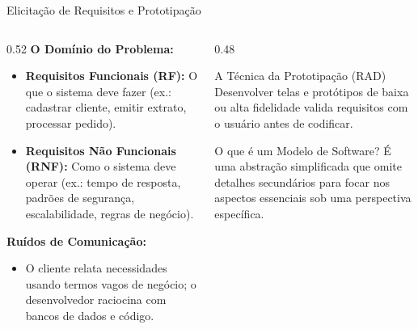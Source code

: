 \documentclass[10pt]{beamer}
\begin{document}
\begin{frame}{Elicitação de Requisitos e Prototipação}
    \begin{columns}
        \begin{column}{0.52\textwidth}
            \textbf{O Domínio do Problema:}
            \begin{itemize}
                \item \textbf{Requisitos Funcionais (RF):} O que o sistema deve fazer (ex.: cadastrar cliente, emitir extrato, processar pedido).
                \item \textbf{Requisitos Não Funcionais (RNF):} Como o sistema deve operar (ex.: tempo de resposta, padrões de segurança, escalabilidade, regras de negócio).
            \end{itemize}
            \vspace{0.2cm}
            \textbf{Ruídos de Comunicação:}
            \begin{itemize}
                \item O cliente relata necessidades usando termos vagos de negócio; o desenvolvedor raciocina com bancos de dados e código.
            \end{itemize}
        \end{column}
        \begin{column}{0.48\textwidth}
            \begin{block}{A Técnica da Prototipação (RAD)}
                Desenvolver telas e protótipos de baixa ou alta fidelidade valida requisitos com o usuário antes de codificar.
            \end{block}
            \vspace{0.2cm}
            \begin{alertblock}{O que é um Modelo de Software?}
                É uma abstração simplificada que omite detalhes secundários para focar nos aspectos essenciais sob uma perspectiva específica.
            \end{alertblock}
        \end{column}
    \end{columns}
\end{frame}
\end{document}
